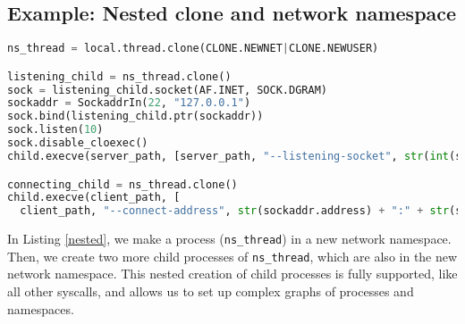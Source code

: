 \documentclass{acmart}
\begin{document}
\subsection{Example: Nested clone and network namespace}
\begin{lstlisting}[float,language=Python,label={nested},caption={Nested clone and network namespace}]
ns_thread = local.thread.clone(CLONE.NEWNET|CLONE.NEWUSER)

listening_child = ns_thread.clone()
sock = listening_child.socket(AF.INET, SOCK.DGRAM)
sockaddr = SockaddrIn(22, "127.0.0.1")
sock.bind(listening_child.ptr(sockaddr))
sock.listen(10)
sock.disable_cloexec()
child.execve(server_path, [server_path, "--listening-socket", str(int(sock))])

connecting_child = ns_thread.clone()
child.execve(client_path, [
  client_path, "--connect-address", str(sockaddr.address) + ":" + str(sockaddr.port)])
\end{lstlisting}
In Listing \ref{nested},
we make a process (\texttt{ns\_thread}) in a new network namespace.
Then, we create two more child processes of \texttt{ns\_thread},
which are also in the new network namespace.
This nested creation of child processes is fully supported,
like all other syscalls,
and allows us to set up complex graphs of processes and namespaces.
\end{document}
